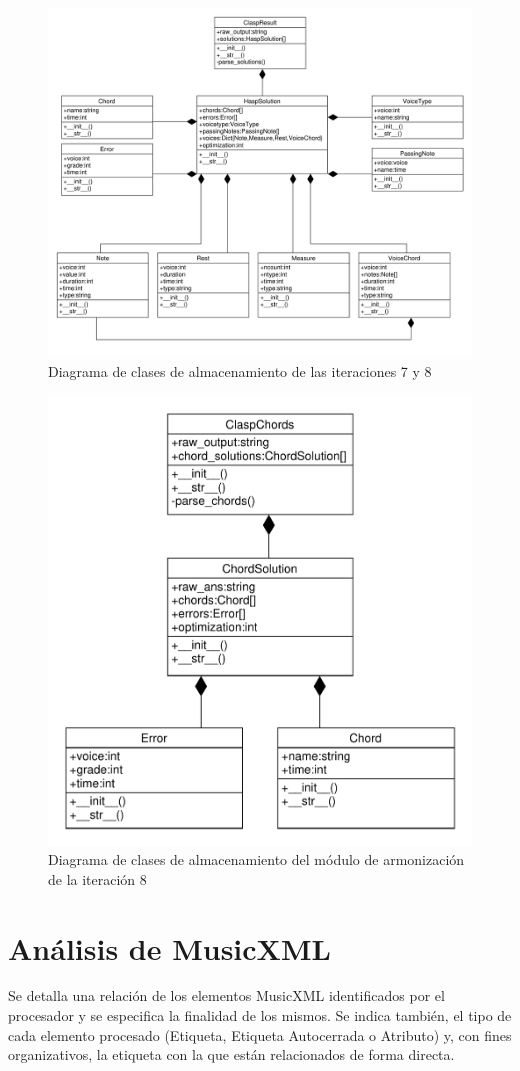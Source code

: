\begin{figure}[th]
	\centering
	\includegraphics[width=0.8\linewidth]{imagenes/last_iters.pdf}
	\caption{Diagrama de clases de almacenamiento de las iteraciones 7 y 8}
	\label{fig:class_diagram_note_upgrade}
\end{figure}
\begin{figure}[th]
	\centering
	\includegraphics[width=0.8\linewidth]{imagenes/chord_diagram.pdf}
	\caption{Diagrama de clases de almacenamiento del módulo de armonización de la iteración 8}
	\label{fig:class_diagram_chords}
\end{figure}

\chapter{Análisis de MusicXML}
Se detalla una relación de los elementos MusicXML identificados por el procesador y se especifica la finalidad de los mismos. Se indica también, el tipo de cada elemento procesado (Etiqueta, Etiqueta Autocerrada o Atributo) y, con fines organizativos, la etiqueta con la que están relacionados de forma directa.

